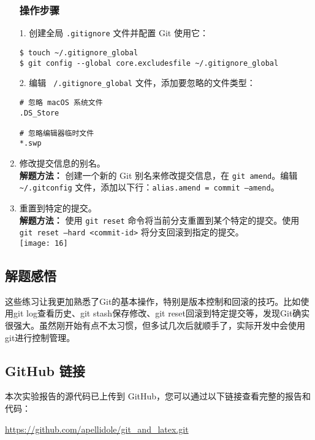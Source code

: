 \documentclass[12pt]{article}
\begin{document}
\begin{enumerate}
\subsubsection*{操作步骤}

1. 创建全局 \texttt{.gitignore} 文件并配置 Git 使用它：

\begin{verbatim}
$ touch ~/.gitignore_global
$ git config --global core.excludesfile ~/.gitignore_global
\end{verbatim}

2. 编辑 \texttt{~/.gitignore\_global} 文件，添加要忽略的文件类型：

\begin{verbatim}
# 忽略 macOS 系统文件
.DS_Store

# 忽略编辑器临时文件
*.swp
\end{verbatim}

    
    \item 修改提交信息的别名。\\
\textbf{解题方法：} 创建一个新的 Git 别名来修改提交信息，在 \texttt{git amend}。编辑 \texttt{\textasciitilde/.gitconfig} 文件，添加以下行：\texttt{alias.amend = commit --amend}。

\item 重置到特定的提交。\\
\textbf{解题方法：} 使用 \texttt{git reset} 命令将当前分支重置到某个特定的提交。使用 \texttt{git reset --hard <commit-id>} 将分支回滚到指定的提交。\\
\texttt{[image: 16]}
\end{enumerate}



\subsection*{解题感悟}
这些练习让我更加熟悉了Git的基本操作，特别是版本控制和回滚的技巧。比如使用git log查看历史、git stash保存修改、git reset回滚到特定提交等，发现Git确实很强大。虽然刚开始有点不太习惯，但多试几次后就顺手了，实际开发中会使用git进行控制管理。

\subsection*{GitHub 链接}

本次实验报告的源代码已上传到 GitHub，您可以通过以下链接查看完整的报告和代码：

\url{https://github.com/apellidole/git_and_latex.git}
\end{document}
